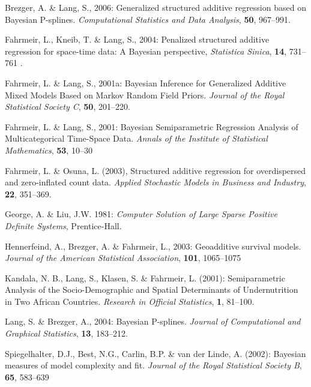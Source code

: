 \documentclass[a4paper]{article}
\begin{document}
\begin{thebibliography}{99}

 Brezger, A. \& Lang,
S., 2006: Generalized structured additive regression based on
Bayesian P-splines. {\it Computational Statistics and Data
Analysis}, {\bf 50}, 967--991.

 Fahrmeir, L., Kneib,
T. \& Lang, S., 2004: Penalized structured additive regression for
space-time data: A Bayesian perspective, {\it Statistica Sinica},
{\bf 14}, 731--761 .

 Fahrmeir, L. \&
Lang, S., 2001a: Bayesian Inference for Generalized Additive Mixed
Models Based on Markov Random Field Priors. {\it Journal of the
Royal Statistical Society C}, {\bf 50}, 201--220.

 Fahrmeir, L. \&
Lang, S., 2001: Bayesian Semiparametric Regression Analysis of
Multicategorical Time-Space Data. {\it Annals of the Institute of
Statistical Mathematics}, {\bf 53}, 10--30

 Fahrmeir, L. \&
Osuna, L. (2003), Structured additive regression for overdispersed and zero-inflated count data.
{\it Applied Stochastic Models in Business and Industry}, {\bf 22}, 351--369.

 George, A. \& Liu,
J.W. 1981: {\it Computer Solution of Large Sparse Positive
Definite Systems}, Prentice-Hall.

 Hennerfeind, A.,
Brezger, A. \& Fahrmeir, L., 2003: Geoadditive survival models.
{\it Journal of the American Statistical Association}, {\bf 101}, 1065--1075

 Kandala, N. B., Lang,
S., Klasen, S. \& Fahrmeir, L. (2001): Semiparametric Analysis of
the Socio-Demographic and Spatial Determinants of Undernutrition
in Two African Countries. {\it Research in Official Statistics},
{\bf 1}, 81--100.

 Lang, S. \& Brezger,
A., 2004: Bayesian P-splines. {\it Journal of Computational and
Graphical Statistics}, {\bf 13}, 183--212.

 Spiegelhalter,
D.J., Best, N.G., Carlin, B.P. \& van der Linde, A. (2002):
Bayesian measures of model complexity and fit. {\it Journal of the
Royal Statistical Society B}, {\bf 65}, 583--639

\end{thebibliography}
\end{document}
